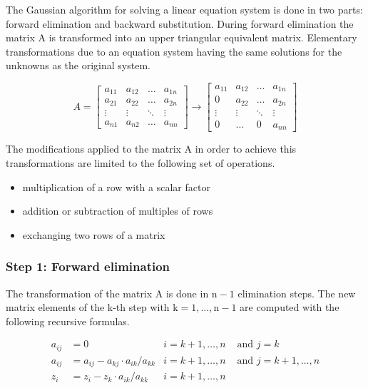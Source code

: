 \documentclass[10pt]{report}
\begin{document}
The Gaussian algorithm for solving a linear equation system is done in
two parts: forward elimination and backward substitution.  During
forward elimination the matrix A is transformed into an upper
triangular equivalent matrix.  Elementary transformations due to an
equation system having the same solutions for the unknowns as the
original system.

\begin{equation}
A =
\begin{bmatrix}
a_{11} & a_{12} & \ldots & a_{1n}\\
a_{21} & a_{22} & \ldots & a_{2n}\\
\vdots & \vdots & \ddots & \vdots\\
a_{n1} & a_{n2} & \ldots & a_{nn}
\end{bmatrix}
\rightarrow
\begin{bmatrix}
a_{11} & a_{12} & \ldots & a_{1n}\\
0 & a_{22} & \ldots & a_{2n}\\
\vdots & \vdots & \ddots & \vdots\\
0 & \ldots & 0 & a_{nn}
\end{bmatrix}
\end{equation}

The modifications applied to the matrix A in order to achieve this
transformations are limited to the following set of operations.
\begin{itemize}
\item multiplication of a row with a scalar factor
\item addition or subtraction of multiples of rows
\item exchanging two rows of a matrix
\end{itemize}

\subsubsection{Step 1: Forward elimination}

The transformation of the matrix A is done in $\mathrm{n - 1}$
elimination steps.  The new matrix elements of the k-th step with
$\mathrm{k = 1, \ldots, n - 1}$ are computed with the following
recursive formulas.

\begin{align}
a_{ij} &= 0 & i = k+1, \ldots, n &\text{ and } j = k\\
a_{ij} &= a_{ij} - a_{kj} \cdot a_{ik} / a_{kk} & i = k+1, \ldots, n &\text{ and } j = k+1, \ldots, n\\
z_{i} &= z_{i} - z_{k} \cdot a_{ik} / a_{kk} & i = k+1, \ldots, n &
\end{align}
\end{document}
